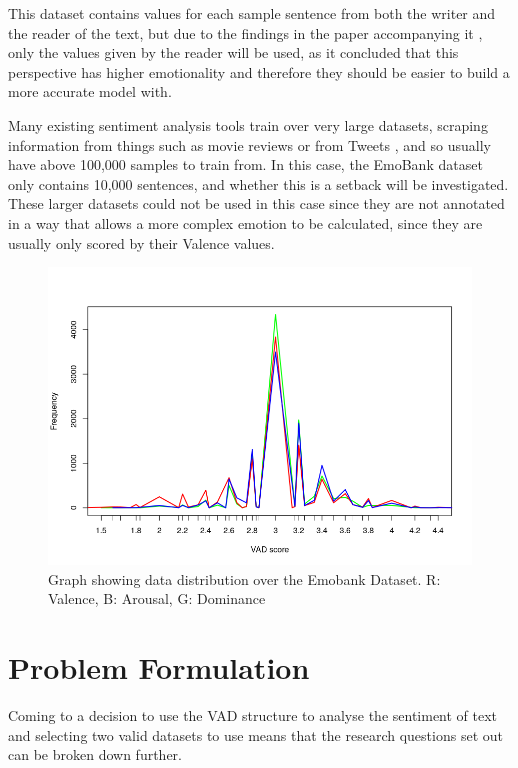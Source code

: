 This dataset contains values for each sample sentence from both the writer and the reader of the text, but due to the findings in the paper accompanying it \cite{emoBank}, only the values given by the reader will be used, as it concluded that this perspective has higher emotionality and therefore they should be easier to build a more accurate model with.

Many existing sentiment analysis tools train over very large datasets, scraping information from things such as movie reviews \cite{socher2013recursive} or from Tweets \cite{towardsDS}, and so usually have above 100,000 samples to train from. In this case, the EmoBank dataset only contains 10,000 sentences, and whether this is a setback will be investigated. These larger datasets could not be used in this case since they are not annotated in a way that allows a more complex emotion to be calculated, since they are usually only scored by their Valence values. 


\begin{figure}[h]
\centering
\includegraphics[scale=0.5]{graphs/VADdistribution.png}
\caption{Graph showing data distribution over the Emobank Dataset. R: Valence, B: Arousal, G: Dominance}
\label{dist:vad}
\end{figure}

\section{Problem Formulation}

Coming to a decision to use the VAD structure to analyse the sentiment of text and selecting two valid datasets to use means that the research questions set out can be broken down further.

